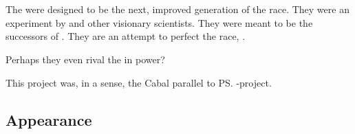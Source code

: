 \section{\NeoResphan}
\index{\neoresphan}
The \neoresphain were designed to be the next, improved generation of the \resphan race. 
They were an experiment by  and other visionary scientists. 
They were meant to be the successors of \resphain. 
They are an attempt to perfect the \resphan{} race, . 

Perhaps they even rival the \satharioth{} in power? 

This project was, in a sense, the Cabal parallel to \ps{\Secherdamon} \Vizsherioch-project. 









\subsection{Appearance}

